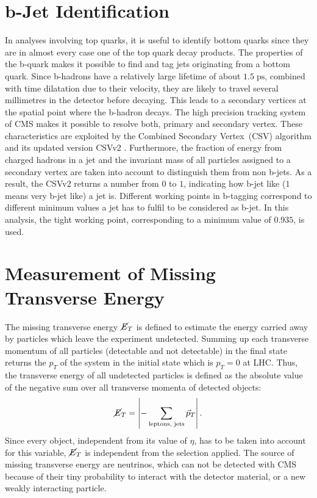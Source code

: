 \section{b-Jet Identification}
\label{sec:btag}
	In analyses involving top quarks, it is useful to identify bottom quarks since they are in almost every case one of the top quark decay products. The properties of the b-quark makes it possible to find and tag jets originating from a bottom quark. Since b-hadrons have a relatively large lifetime of about $1.5\;\text{ps}$, combined with time dilatation due to their velocity, they are likely to travel several millimetres in the detector before decaying. This leads to a secondary vertices at the spatial point where the b-hadron decays. The high precision tracking system of CMS makes it possible to resolve both, primary and secondary vertex. These characteristics are exploited by the Combined Secondary Vertex~(CSV) algorithm \cite{csv} and its updated version CSVv2 \cite{btag}. Furthermore, the fraction of energy from charged hadrons in a jet and the invariant mass of all particles assigned to a secondary vertex are taken into account to distinguish them from non b-jets. As a result, the CSVv2 returns a number from $0$ to $1$, indicating how b-jet like ($1$ means very b-jet like) a jet is. Different working points \cite{btagperf} in b-tagging correspond to different minimum values a jet has to fulfil to be considered as b-jet. In this analysis, the tight working point, corresponding to a minimum value of $0.935$, is used. 
	
\section{Measurement of Missing Transverse Energy}
	The missing transverse energy $\cancel{E}_T$ is defined to estimate the energy carried away by particles which leave the experiment undetected. Summing up each transverse momentum of all particles (detectable and not detectable) in the final state returns the $p_T$ of the system in the initial state which is $p_T = 0$ at LHC. Thus, the transverse energy of all undetected particles is defined as the absolute value of the negative sum over all transverse momenta of detected objects:
	\begin{equation}
		\cancel{E}_T = \left| - \sum_{\textrm{leptons, jets}}^{} \vec{p}_T \right|.
		\label{eq:MET}
	\end{equation}	
	Since every object, independent from its value of $\eta$, has to be taken into account for this variable, $\cancel{E}_T$ is independent from the selection applied. The source of missing transverse energy are neutrinos, which can not be detected with CMS because of their tiny probability to interact with the detector material, or a new weakly interacting particle. 

